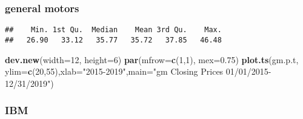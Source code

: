 \documentclass[]{article}
\newenvironment{Shaded}{\begin{snugshade}}{\end{snugshade}}
\newcommand{\KeywordTok}[1]{\textcolor[rgb]{0.13,0.29,0.53}{\textbf{#1}}}
\newcommand{\DataTypeTok}[1]{\textcolor[rgb]{0.13,0.29,0.53}{#1}}
\newcommand{\DecValTok}[1]{\textcolor[rgb]{0.00,0.00,0.81}{#1}}
\newcommand{\FloatTok}[1]{\textcolor[rgb]{0.00,0.00,0.81}{#1}}
\newcommand{\StringTok}[1]{\textcolor[rgb]{0.31,0.60,0.02}{#1}}
\newcommand{\OperatorTok}[1]{\textcolor[rgb]{0.81,0.36,0.00}{\textbf{#1}}}
\newcommand{\NormalTok}[1]{#1}
\begin{document}
\subsubsection{general motors}\label{general-motors}

\begin{Shaded}
\end{Shaded}

\begin{verbatim}
##    Min. 1st Qu.  Median    Mean 3rd Qu.    Max. 
##   26.90   33.12   35.77   35.72   37.85   46.48
\end{verbatim}

\begin{Shaded}
\begin{Highlighting}[]
\KeywordTok{dev.new}\NormalTok{(}\DataTypeTok{width=}\DecValTok{12}\NormalTok{, }\DataTypeTok{height=}\DecValTok{6}\NormalTok{)}
\KeywordTok{par}\NormalTok{(}\DataTypeTok{mfrow=}\KeywordTok{c}\NormalTok{(}\DecValTok{1}\NormalTok{,}\DecValTok{1}\NormalTok{), }\DataTypeTok{mex=}\FloatTok{0.75}\NormalTok{)}
\KeywordTok{plot.ts}\NormalTok{(gm.p.t, }\DataTypeTok{ylim=}\KeywordTok{c}\NormalTok{(}\DecValTok{20}\NormalTok{,}\DecValTok{55}\NormalTok{),}\DataTypeTok{xlab=}\StringTok{"2015-2019"}\NormalTok{,}\DataTypeTok{main=}\StringTok{"gm Closing Prices 01/01/2015-12/31/2019"}\NormalTok{)}
\end{Highlighting}
\end{Shaded}

\subsubsection{IBM}\label{ibm}

\begin{Shaded}
\end{Shaded}
\end{document}
